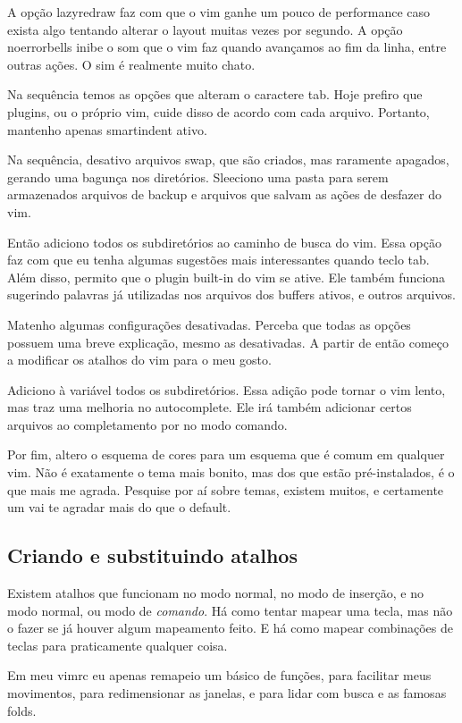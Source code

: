 A opção lazyredraw faz com que o vim ganhe um pouco de performance caso exista algo tentando alterar o layout muitas vezes por segundo.
A opção noerrorbells inibe o som que o vim faz quando avançamos ao fim da linha, entre outras ações.
O sim é realmente muito chato.

Na sequência temos as opções que alteram o caractere tab.
Hoje prefiro que plugins, ou o próprio vim, cuide disso de acordo com cada arquivo.
Portanto, mantenho apenas smartindent ativo.

Na sequência, desativo arquivos swap, que são criados, mas raramente apagados, gerando uma bagunça nos diretórios.
Sleeciono uma pasta para serem armazenados arquivos de backup e arquivos que salvam as ações de desfazer do vim.

Então adiciono todos os subdiretórios ao caminho de busca do vim.
Essa opção faz com que eu tenha algumas sugestões mais interessantes quando teclo tab.
Além disso, permito que o plugin built-in do vim se ative.
Ele também funciona sugerindo palavras já utilizadas nos arquivos dos buffers ativos, e outros arquivos.

Matenho algumas configurações desativadas.
Perceba que todas as opções possuem uma breve explicação, mesmo as desativadas.
A partir de então começo a modificar os atalhos do vim para o meu gosto.

Adiciono à variável  todos os subdiretórios.
Essa adição pode tornar o vim lento, mas traz uma melhoria no autocomplete.
Ele irá também adicionar certos arquivos ao completamento por  no modo comando.

Por fim, altero o esquema de cores para um esquema que é comum em qualquer vim.
Não é exatamente o tema mais bonito, mas dos que estão pré-instalados, é o que mais me agrada.
Pesquise por aí sobre temas, existem muitos, e certamente um vai te agradar mais do que o default.


\subsection{Criando e substituindo atalhos}
Existem atalhos que funcionam no modo normal, no modo de inserção, e no modo normal, ou modo de \emph{comando}.
Há como tentar mapear uma tecla, mas não o fazer se já houver algum mapeamento feito.
E há como mapear combinações de teclas para praticamente qualquer coisa.

Em meu vimrc eu apenas remapeio um básico de funções, para facilitar meus movimentos,
para redimensionar as janelas, e para lidar com busca e as famosas folds.

